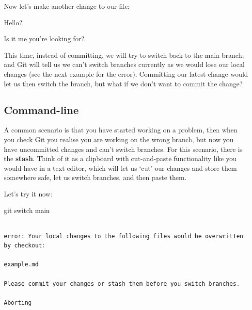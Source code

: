\documentclass[
  letterpaper,
  DIV=11,
  numbers=noendperiod]{scrartcl}
\newenvironment{Shaded}{\begin{snugshade}}{\end{snugshade}}
\newcommand{\FunctionTok}[1]{\textcolor[rgb]{0.28,0.35,0.67}{#1}}
\newcommand{\NormalTok}[1]{\textcolor[rgb]{0.00,0.23,0.31}{#1}}
\begin{document}
Now let's make another change to our file:

\begin{tcolorbox}[enhanced jigsaw, opacitybacktitle=0.6, arc=.35mm, toprule=.15mm, leftrule=.75mm, colbacktitle=quarto-callout-note-color!10!white, bottomrule=.15mm, rightrule=.15mm, opacityback=0, title=\textcolor{quarto-callout-note-color}{\faInfo}\hspace{0.5em}{example.md}, toptitle=1mm, breakable, left=2mm, colback=white, titlerule=0mm, bottomtitle=1mm, coltitle=black, colframe=quarto-callout-note-color-frame]

Hello?

Is it me you're looking for?

\end{tcolorbox}

This time, instead of committing, we will try to switch back to the main
branch, and Git will tell us we can't switch branches currently as we
would lose our local changes (see the next example for the error).
Committing our latest change would let us then switch the branch, but
what if we don't want to commit the change?

\subsection{Command-line}

A common scenario is that you have started working on a problem, then
when you check Git you realise you are working on the wrong branch, but
now you have uncommitted changes and can't switch branches. For this
scenario, there is the \textbf{stash}. Think of it as a clipboard with
cut-and-paste functionality like you would have in a text editor, which
will let us `cut' our changes and store them somewhere safe, let us
switch branches, and then paste them.

Let's try it now:

\begin{Shaded}
\begin{Highlighting}[]
\FunctionTok{git}\NormalTok{ switch main}
\end{Highlighting}
\end{Shaded}

\begin{verbatim}

error: Your local changes to the following files would be overwritten by checkout:

example.md

Please commit your changes or stash them before you switch branches.

Aborting
\end{verbatim}
\end{document}
